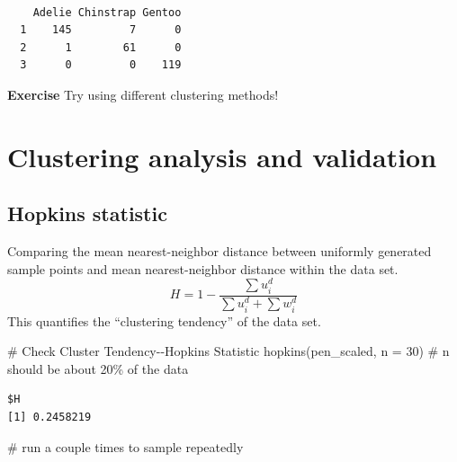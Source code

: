 \documentclass[
  letterpaper,
  DIV=11,
  numbers=noendperiod]{scrreprt}
\newenvironment{Shaded}{\begin{snugshade}}{\end{snugshade}}
\newcommand{\AttributeTok}[1]{\textcolor[rgb]{0.40,0.45,0.13}{#1}}
\newcommand{\CommentTok}[1]{\textcolor[rgb]{0.37,0.37,0.37}{#1}}
\newcommand{\DecValTok}[1]{\textcolor[rgb]{0.68,0.00,0.00}{#1}}
\newcommand{\FunctionTok}[1]{\textcolor[rgb]{0.28,0.35,0.67}{#1}}
\newcommand{\NormalTok}[1]{\textcolor[rgb]{0.00,0.23,0.31}{#1}}
\newcommand{\SpecialCharTok}[1]{\textcolor[rgb]{0.37,0.37,0.37}{#1}}
\begin{document}
\begin{Shaded}
\end{Shaded}

\begin{verbatim}
   
    Adelie Chinstrap Gentoo
  1    145         7      0
  2      1        61      0
  3      0         0    119
\end{verbatim}

\textbf{Exercise} Try using different clustering methods!

\hypertarget{clustering-analysis-and-validation}{%
\section{Clustering analysis and
validation}\label{clustering-analysis-and-validation}}

\hypertarget{hopkins-statistic}{%
\subsection{Hopkins statistic}\label{hopkins-statistic}}

Comparing the mean nearest-neighbor distance between uniformly generated
sample points and mean nearest-neighbor distance within the data set. \[
H = 1 - \frac{\sum u^d_i}{\sum u^d_i + \sum w^d_i}
\] This quantifies the ``clustering tendency'' of the data set.

\begin{Shaded}
\begin{Highlighting}[]
\CommentTok{\# Check Cluster Tendency{-}{-}Hopkins Statistic}
\FunctionTok{hopkins}\NormalTok{(pen\_scaled, }\AttributeTok{n =} \DecValTok{30}\NormalTok{) }\CommentTok{\# n should be about 20\% of the data}
\end{Highlighting}
\end{Shaded}

\begin{verbatim}
$H
[1] 0.2458219
\end{verbatim}

\begin{Shaded}
\begin{Highlighting}[]
\CommentTok{\# run a couple times to sample repeatedly}
\end{Highlighting}
\end{Shaded}
\end{document}
